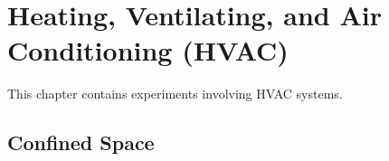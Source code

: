 
\chapter{Heating, Ventilating, and Air Conditioning (HVAC)}

This chapter contains experiments involving HVAC systems.

\section{Confined Space}





